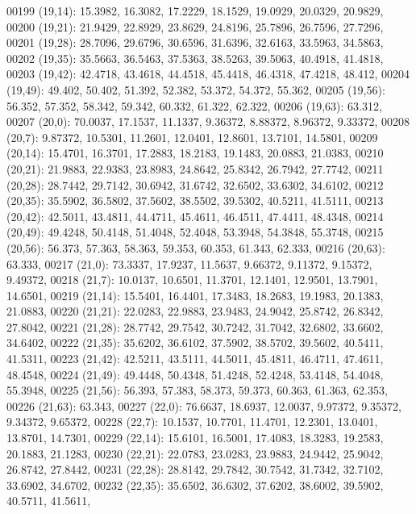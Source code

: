 \begin{DoxyCode}
00199       (19,14): 15.3982, 16.3082, 17.2229, 18.1529, 19.0929, 20.0329, 20.9829,
00200       (19,21): 21.9429, 22.8929, 23.8629, 24.8196, 25.7896, 26.7596, 27.7296,
00201       (19,28): 28.7096, 29.6796, 30.6596, 31.6396, 32.6163, 33.5963, 34.5863,
00202       (19,35): 35.5663, 36.5463, 37.5363, 38.5263, 39.5063, 40.4918, 41.4818,
00203       (19,42): 42.4718, 43.4618, 44.4518, 45.4418, 46.4318, 47.4218, 48.412,
00204       (19,49): 49.402, 50.402, 51.392, 52.382, 53.372, 54.372, 55.362,
00205       (19,56): 56.352, 57.352, 58.342, 59.342, 60.332, 61.322, 62.322,
00206       (19,63): 63.312,
00207       (20,0): 70.0037, 17.1537, 11.1337, 9.36372, 8.88372, 8.96372, 9.33372,
00208       (20,7): 9.87372, 10.5301, 11.2601, 12.0401, 12.8601, 13.7101, 14.5801,
00209       (20,14): 15.4701, 16.3701, 17.2883, 18.2183, 19.1483, 20.0883, 21.0383,
00210       (20,21): 21.9883, 22.9383, 23.8983, 24.8642, 25.8342, 26.7942, 27.7742,
00211       (20,28): 28.7442, 29.7142, 30.6942, 31.6742, 32.6502, 33.6302, 34.6102,
00212       (20,35): 35.5902, 36.5802, 37.5602, 38.5502, 39.5302, 40.5211, 41.5111,
00213       (20,42): 42.5011, 43.4811, 44.4711, 45.4611, 46.4511, 47.4411, 48.4348,
00214       (20,49): 49.4248, 50.4148, 51.4048, 52.4048, 53.3948, 54.3848, 55.3748,
00215       (20,56): 56.373, 57.363, 58.363, 59.353, 60.353, 61.343, 62.333,
00216       (20,63): 63.333,
00217       (21,0): 73.3337, 17.9237, 11.5637, 9.66372, 9.11372, 9.15372, 9.49372,
00218       (21,7): 10.0137, 10.6501, 11.3701, 12.1401, 12.9501, 13.7901, 14.6501,
00219       (21,14): 15.5401, 16.4401, 17.3483, 18.2683, 19.1983, 20.1383, 21.0883,
00220       (21,21): 22.0283, 22.9883, 23.9483, 24.9042, 25.8742, 26.8342, 27.8042,
00221       (21,28): 28.7742, 29.7542, 30.7242, 31.7042, 32.6802, 33.6602, 34.6402,
00222       (21,35): 35.6202, 36.6102, 37.5902, 38.5702, 39.5602, 40.5411, 41.5311,
00223       (21,42): 42.5211, 43.5111, 44.5011, 45.4811, 46.4711, 47.4611, 48.4548,
00224       (21,49): 49.4448, 50.4348, 51.4248, 52.4248, 53.4148, 54.4048, 55.3948,
00225       (21,56): 56.393, 57.383, 58.373, 59.373, 60.363, 61.363, 62.353,
00226       (21,63): 63.343,
00227       (22,0): 76.6637, 18.6937, 12.0037, 9.97372, 9.35372, 9.34372, 9.65372,
00228       (22,7): 10.1537, 10.7701, 11.4701, 12.2301, 13.0401, 13.8701, 14.7301,
00229       (22,14): 15.6101, 16.5001, 17.4083, 18.3283, 19.2583, 20.1883, 21.1283,
00230       (22,21): 22.0783, 23.0283, 23.9883, 24.9442, 25.9042, 26.8742, 27.8442,
00231       (22,28): 28.8142, 29.7842, 30.7542, 31.7342, 32.7102, 33.6902, 34.6702,
00232       (22,35): 35.6502, 36.6302, 37.6202, 38.6002, 39.5902, 40.5711, 41.5611,

\end{DoxyCode}
